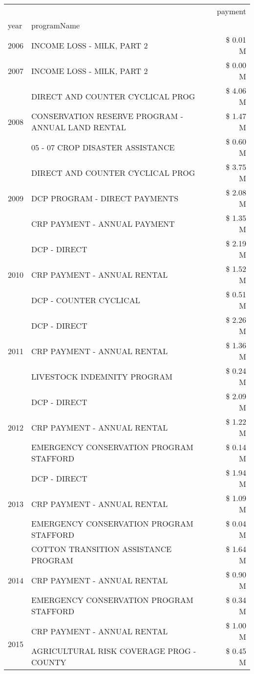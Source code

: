 \begin{tabular}{llr}
\toprule
 &  & payment \\
year & programName &  \\
\midrule
2006 & INCOME LOSS - MILK, PART 2 & \$ 0.01 M \\
\cline{1-3}
2007 & INCOME LOSS - MILK, PART 2 & \$ 0.00 M \\
\cline{1-3}
\multirow[t]{3}{*}{2008} & DIRECT AND COUNTER CYCLICAL PROG & \$ 4.06 M \\
 & CONSERVATION RESERVE PROGRAM - ANNUAL LAND RENTAL & \$ 1.47 M \\
 & 05 - 07 CROP DISASTER ASSISTANCE & \$ 0.60 M \\
\cline{1-3}
\multirow[t]{3}{*}{2009} & DIRECT AND COUNTER CYCLICAL PROG & \$ 3.75 M \\
 & DCP PROGRAM - DIRECT PAYMENTS & \$ 2.08 M \\
 & CRP PAYMENT - ANNUAL PAYMENT & \$ 1.35 M \\
\cline{1-3}
\multirow[t]{3}{*}{2010} & DCP - DIRECT & \$ 2.19 M \\
 & CRP PAYMENT - ANNUAL RENTAL & \$ 1.52 M \\
 & DCP - COUNTER CYCLICAL & \$ 0.51 M \\
\cline{1-3}
\multirow[t]{3}{*}{2011} & DCP - DIRECT & \$ 2.26 M \\
 & CRP PAYMENT - ANNUAL RENTAL & \$ 1.36 M \\
 & LIVESTOCK INDEMNITY PROGRAM & \$ 0.24 M \\
\cline{1-3}
\multirow[t]{3}{*}{2012} & DCP - DIRECT & \$ 2.09 M \\
 & CRP PAYMENT - ANNUAL RENTAL & \$ 1.22 M \\
 & EMERGENCY CONSERVATION PROGRAM STAFFORD & \$ 0.14 M \\
\cline{1-3}
\multirow[t]{3}{*}{2013} & DCP - DIRECT & \$ 1.94 M \\
 & CRP PAYMENT - ANNUAL RENTAL & \$ 1.09 M \\
 & EMERGENCY CONSERVATION PROGRAM STAFFORD & \$ 0.04 M \\
\cline{1-3}
\multirow[t]{3}{*}{2014} & COTTON TRANSITION ASSISTANCE PROGRAM & \$ 1.64 M \\
 & CRP PAYMENT - ANNUAL RENTAL & \$ 0.90 M \\
 & EMERGENCY CONSERVATION PROGRAM STAFFORD & \$ 0.34 M \\
\cline{1-3}
\multirow[t]{3}{*}{2015} & CRP PAYMENT - ANNUAL RENTAL & \$ 1.00 M \\
 & AGRICULTURAL RISK COVERAGE PROG - COUNTY & \$ 0.45 M \\

\end{tabular}
